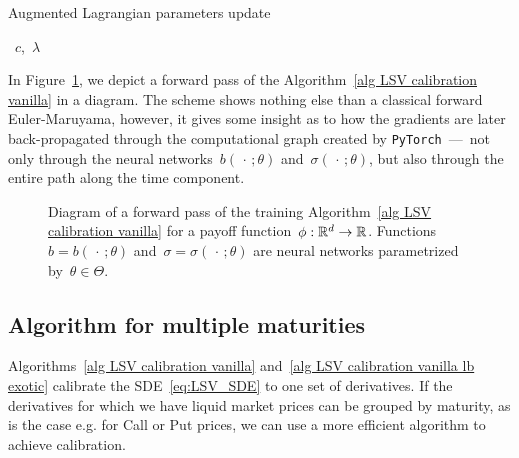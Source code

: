 \begin{algorithm}[htb]\caption{Augmented Lagrangian parameters update \cite{Hestenes1969MultiplierMethods}}\label{alg LSV Augmented Lagrangian}
\begin{algorithmic}
\RETURN~$c$,~$\lambda$
\end{algorithmic}
\end{algorithm}

In Figure~\ref{fig:forwardpass}, we depict a forward pass of the Algorithm~\ref{alg LSV calibration vanilla} in a diagram. The scheme shows nothing else than a classical forward Euler-Maruyama, however, it gives some insight as to how the gradients are later back-propagated through the computational graph created by \texttt{PyTorch}~\nobreakdash---~not only through the neural networks~$b(\,\cdot\, ;\theta)$ and~$\sigma(\,\cdot\,; \theta)$, but also through the entire path along the time component.

\begin{figure}[H]
  
  \caption{Diagram of a forward pass of the training Algorithm~\ref{alg LSV calibration vanilla} for a payoff function~$\phi:\mathbb{R}^d\to \mathbb{R}$. Functions~$b=b(\,\cdot\,;\theta)$ and~$\sigma=\sigma(\,\cdot\,;\theta)$ are neural networks parametrized by~$\theta\in\Theta$.}
  \label{fig:forwardpass}
\end{figure}

\subsection{Algorithm for multiple maturities}\label{sec many maturities}

Algorithms~\ref{alg LSV calibration vanilla} and~\ref{alg LSV calibration vanilla lb exotic}
calibrate the SDE~\eqref{eq:LSV_SDE} to one set of derivatives. 
If the derivatives for which we have liquid market prices can be grouped by  
maturity, as is the case e.g. for Call or Put prices, we
can use a more efficient algorithm to achieve calibration. 
 
